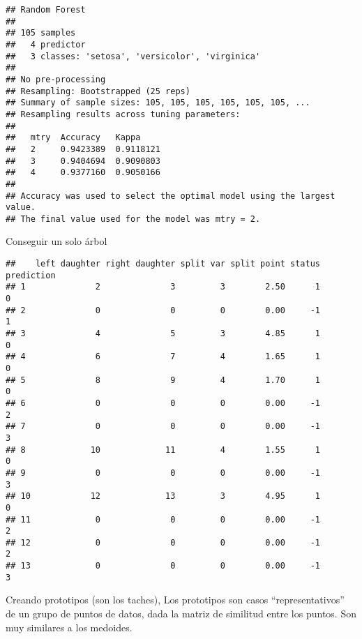 \documentclass[
]{article}
\newenvironment{Shaded}{\begin{snugshade}}{\end{snugshade}}
\newcommand{\AttributeTok}[1]{\textcolor[rgb]{0.77,0.63,0.00}{#1}}
\newcommand{\DecValTok}[1]{\textcolor[rgb]{0.00,0.00,0.81}{#1}}
\newcommand{\FunctionTok}[1]{\textcolor[rgb]{0.00,0.00,0.00}{#1}}
\newcommand{\NormalTok}[1]{#1}
\newcommand{\SpecialCharTok}[1]{\textcolor[rgb]{0.00,0.00,0.00}{#1}}
\begin{document}
\begin{verbatim}
## Random Forest 
## 
## 105 samples
##   4 predictor
##   3 classes: 'setosa', 'versicolor', 'virginica' 
## 
## No pre-processing
## Resampling: Bootstrapped (25 reps) 
## Summary of sample sizes: 105, 105, 105, 105, 105, 105, ... 
## Resampling results across tuning parameters:
## 
##   mtry  Accuracy   Kappa    
##   2     0.9423389  0.9118121
##   3     0.9404694  0.9090803
##   4     0.9377160  0.9050166
## 
## Accuracy was used to select the optimal model using the largest value.
## The final value used for the model was mtry = 2.
\end{verbatim}

Conseguir un solo árbol

\begin{Shaded}
\end{Shaded}

\begin{verbatim}
##    left daughter right daughter split var split point status prediction
## 1              2              3         3        2.50      1          0
## 2              0              0         0        0.00     -1          1
## 3              4              5         3        4.85      1          0
## 4              6              7         4        1.65      1          0
## 5              8              9         4        1.70      1          0
## 6              0              0         0        0.00     -1          2
## 7              0              0         0        0.00     -1          3
## 8             10             11         4        1.55      1          0
## 9              0              0         0        0.00     -1          3
## 10            12             13         3        4.95      1          0
## 11             0              0         0        0.00     -1          2
## 12             0              0         0        0.00     -1          2
## 13             0              0         0        0.00     -1          3
\end{verbatim}

Creando prototipos (son los taches), Los prototipos son casos
``representativos'' de un grupo de puntos de datos, dada la matriz de
similitud entre los puntos. Son muy similares a los medoides.
\end{document}
